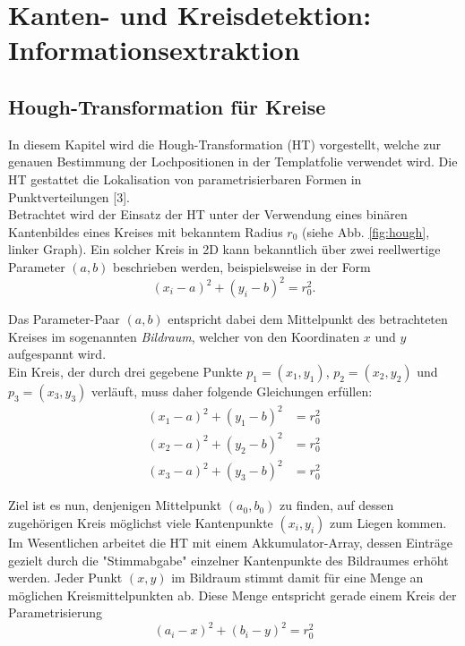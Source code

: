 \documentclass[accentcolor=tud1c, 11pt, toc=bib, toc=listof, captions=abovetable, parskip=half]{tudreport}
\begin{document}
\chapter{Kanten- und Kreisdetektion: Informationsextraktion}
\label{ch:kreisdetektion}

\section{Hough-Transformation für Kreise}
In diesem Kapitel wird die Hough-Transformation (HT) vorgestellt, welche zur genauen Bestimmung der Lochpositionen in der Templatfolie verwendet wird. Die HT gestattet die Lokalisation von parametrisierbaren Formen in Punktverteilungen [3]. \\

Betrachtet wird der Einsatz der HT unter der Verwendung eines binären Kantenbildes eines Kreises mit bekanntem Radius $r_0$ (siehe Abb. \ref{fig:hough}, linker Graph). Ein solcher Kreis in 2D kann bekanntlich über zwei reellwertige Parameter $(a,b)$ beschrieben werden, beispielsweise in der Form\\
\begin{equation}
(x_i-a)^2 + (y_i-b)^2 = r_0^2.
\end{equation}

Das Parameter-Paar $(a,b)$ entspricht dabei dem Mittelpunkt des betrachteten Kreises im sogenannten \textit{Bildraum}, welcher von den Koordinaten $x$ und $y$ aufgespannt wird.\\
Ein Kreis, der durch drei gegebene Punkte $p_1=(x_1,y_1)$, $p_2=(x_2,y_2)$ und $p_3=(x_3,y_3)$ verläuft, muss daher folgende Gleichungen erfüllen:\\
\begin{equation}
  \begin{aligned}
	(x_1-a)^2 + (y_1-b)^2 & = r_0^2 \\
	(x_2-a)^2 + (y_2-b)^2 & = r_0^2 \\
	(x_3-a)^2 + (y_3-b)^2 & = r_0^2
  \end{aligned}
\end{equation}

Ziel ist es nun, denjenigen Mittelpunkt $(a_0,b_0)$ zu finden, auf dessen zugehörigen Kreis möglichst viele Kantenpunkte $(x_i,y_i)$ zum Liegen kommen.\\
Im Wesentlichen arbeitet die HT mit einem Akkumulator-Array, dessen Einträge gezielt durch die "Stimmabgabe" einzelner Kantenpunkte des Bildraumes erhöht werden. Jeder Punkt $(x,y)$ im Bildraum stimmt damit für eine Menge an möglichen Kreismittelpunkten ab. Diese Menge entspricht gerade einem Kreis der Parametrisierung\\ 
\begin{equation}
(a_i-x)^2 + (b_i-y)^2 = r_0^2
\end{equation}
\end{document}
